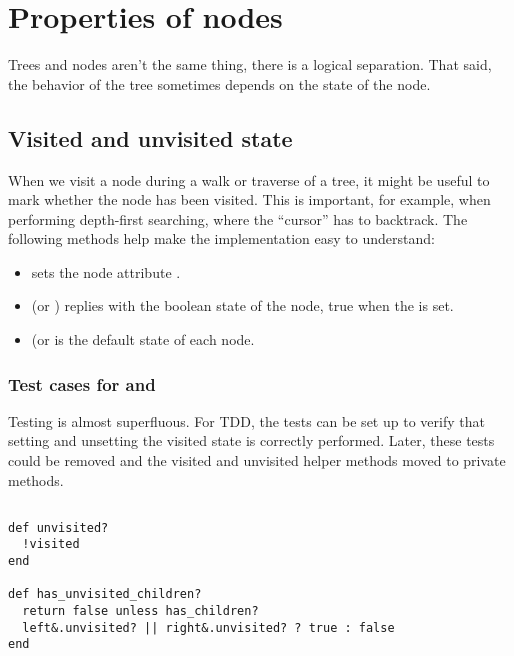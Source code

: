 \documentclass{article}
\begin{document}
\section{Properties of nodes}

Trees and nodes aren't the same thing, there is a logical separation.
That said, the behavior of the tree sometimes depends on the state of the
node.

\subsection{Visited and unvisited state}

When we visit a node during a walk or traverse of a tree, it might be
useful to mark whether the node has been visited. This is important, for
example, when performing depth-first searching, where the ``cursor'' has
to backtrack. The following methods help make the implementation easy
to understand:

\begin{itemize}
  \item {} sets the node attribute .
  \item {} (or ) replies with the boolean
    state of the node, true when the  is set.
  \item {} (or  is the default state
      of each node.
\end{itemize}

\subsubsection{Test cases for  and }

Testing is almost superfluous. For TDD, the tests can be set up
to verify that setting and unsetting the visited state is correctly
performed. Later, these tests could be removed and the visited and
unvisited helper methods moved to private methods.

\subsection{}

\begin{lstlisting}[frame=single,title=Helper methods for determining child's status.]
def unvisited?
  !visited
end

def has_unvisited_children?
  return false unless has_children?
  left&.unvisited? || right&.unvisited? ? true : false
end
\end{lstlisting}
\end{document}
